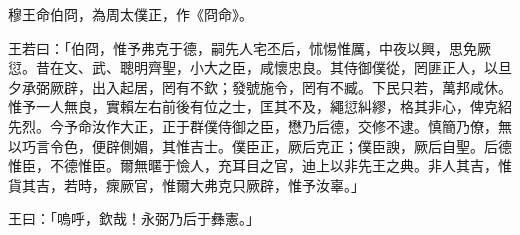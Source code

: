 
\begin{pinyinscope}
穆王命伯冏，為周太僕正，作《冏命》。

王若曰：「伯冏，惟予弗克于德，嗣先人宅丕后，怵惕惟厲，中夜以興，思免厥愆。昔在文、武、聰明齊聖，小大之臣，咸懷忠良。其侍御僕從，罔匪正人，以旦夕承弼厥辟，出入起居，罔有不欽；發號施令，罔有不臧。下民只若，萬邦咸休。惟予一人無良，實賴左右前後有位之士，匡其不及，繩愆糾繆，格其非心，俾克紹先烈。今予命汝作大正，正于群僕侍御之臣，懋乃后德，交修不逮。慎簡乃僚，無以巧言令色，便辟側媚，其惟吉士。僕臣正，厥后克正；僕臣諛，厥后自聖。后德惟臣，不德惟臣。爾無暱于憸人，充耳目之官，迪上以非先王之典。非人其吉，惟貨其吉，若時，瘝厥官，惟爾大弗克只厥辟，惟予汝辜。」

王曰：「嗚呼，欽哉！永弼乃后于彝憲。」


\end{pinyinscope}